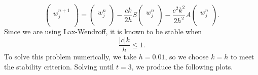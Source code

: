 \documentclass{article}
\begin{document}
\[
\begin{pmatrix}
	\\	w^{n+1}_j \\ \\
\end{pmatrix}=\begin{pmatrix}
	\\	w^n_j \\ \\
\end{pmatrix}-\frac{ck}{2h}S\begin{pmatrix}
	\\	w^n_j \\ \\
\end{pmatrix}-\frac{c^2k^2}{2h^2}A\begin{pmatrix}
	\\	w^n_j \\ \\
\end{pmatrix}.
\] 
Since we are using Lax-Wendroff, it is known to be stable when 
\[
\frac{|c|k}{h}\leq1.
\]
To solve this problem numerically, we take $h=0.01$, so we choose $k=h$ to meet the stability criterion. Solving until $t=3$, we produce the following plots.
\end{document}
